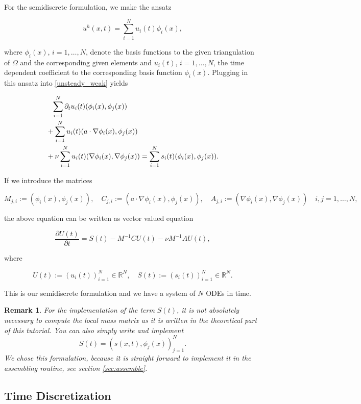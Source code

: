 \documentclass[a4paper, 11pt, twoside]{article}
\newtheorem{remark}{Remark}[section]
\begin{document}
For the semidiscrete formulation, we make the ansatz

	\[u^{h}(x, t) = \sum_{i = 1}^{N}u_{i}(t)\phi_{i}(x),\]
	
where $\phi_{i}(x)$, $i = 1, \ldots, N$, denote the basis functions to the given triangulation of $\Omega$ and the corresponding given elements and $u_{i}(t)$, $i = 1, \ldots, N$, the time dependent coefficient to the corresponding basis function $\phi_{i}(x)$. Plugging in this ansatz into \eqref{unsteady_weak} yields

	\begin{align}
	\notag &\phantom{=} \sum_{i = 1}^{N}\partial_{t}u_{i}(t)(\phi_{i}(x), \phi_{j}(x)) \\
	\notag & + \sum_{i = 1}^{N}u_{i}(t)(a \cdot \nabla\phi_{i}(x), \phi_{j}(x)) \\
	\label{FE}&+ \nu\sum_{i = 1}^{N}u_{i}(t)(\nabla\phi_{i}(x), \nabla\phi_{j}(x)) = \sum_{i = 1}^{N}s_{i}(t)(\phi_{i}(x), \phi_{j}(x)).
	\end{align}
	
If we introduce the matrices

	\[M_{j, i} := (\phi_{i}(x), \phi_{j}(x)), \quad C_{j, i} := (a \cdot \nabla\phi_{i}(x), \phi_{j}(x)), \quad A_{j, i} := (\nabla\phi_{i}(x), \nabla\phi_{j}(x)) \quad i, j = 1, \ldots, N,\]
	
the above equation can be written as vector valued equation

	\begin{equation}\label{semidiscrete}
		\frac{\partial U(t)}{\partial t} = S(t) - M^{-1}CU(t) - \nu M^{-1}AU(t),
	\end{equation}
	
where

	\[U(t) := (u_{i}(t))_{i = 1}^{N} \in \mathbb{R}^{N}, \quad S(t) := (s_{i}(t))_{i = 1}^{N} \in \mathbb{R}^{N}.\]
	
This is our semidiscrete formulation and we have a system of $N$ ODEs in time.

\begin{remark}
For the implementation of the term $S(t)$, it is not absolutely necessary to compute the local mass matrix as it is written in the theoretical part of this tutorial. 
You can also simply write and implement
	\[S(t) = (s(x, t), \phi_{j}(x))_{j = 1}^{N}.\]
We chose this formulation, because it is straight forward to implement it in the assembling routine, see section \ref{sec:assemble}.
\end{remark}

\subsection{Time Discretization}
\end{document}
